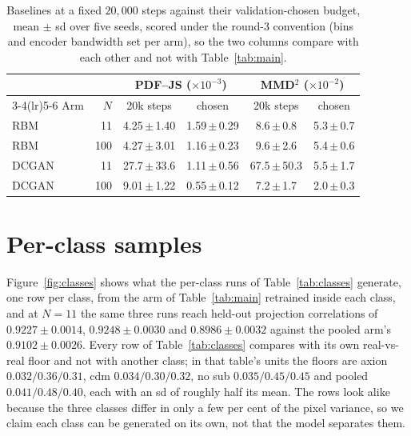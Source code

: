 \documentclass{article}
\begin{document}
\begin{table}[tb]
\centering
\caption{Baselines at a fixed $20{,}000$ steps against their validation-chosen budget, mean $\pm$ sd
over five seeds, scored under the round-3 convention (bins and encoder bandwidth set per arm), so the
two columns compare with each other and not with Table~\ref{tab:main}.}
\label{tab:es}
\scriptsize
\setlength{\tabcolsep}{5pt}
\begin{tabular}{lrcccc}
\toprule
& & \multicolumn{2}{c}{PDF--JS ($\times10^{-3}$)} & \multicolumn{2}{c}{MMD$^2$ ($\times10^{-2}$)} \\
\cmidrule(lr){3-4}\cmidrule(lr){5-6}
Arm & $N$ & 20k steps & chosen & 20k steps & chosen \\
\midrule
RBM   & 11  & 4.25\,$\pm$\,1.40 & 1.59\,$\pm$\,0.29 & 8.6\,$\pm$\,0.8 & 5.3\,$\pm$\,0.7 \\
RBM   & 100 & 4.27\,$\pm$\,3.01 & 1.16\,$\pm$\,0.23 & 9.6\,$\pm$\,2.6 & 5.4\,$\pm$\,0.6 \\
DCGAN & 11  & 27.7\,$\pm$\,33.6 & 1.11\,$\pm$\,0.56 & 67.5\,$\pm$\,50.3 & 5.5\,$\pm$\,1.7 \\
DCGAN & 100 & 9.01\,$\pm$\,1.22 & 0.55\,$\pm$\,0.12 & 7.2\,$\pm$\,1.7 & 2.0\,$\pm$\,0.3 \\
\bottomrule
\end{tabular}
\end{table}

\section{Per-class samples}
\label{app:classes}

Figure~\ref{fig:classes} shows what the per-class runs of Table~\ref{tab:classes} generate, one row
per class, from the arm of Table~\ref{tab:main} retrained inside each class, and at $N{=}11$ the same
three runs reach held-out projection correlations of
$0.9227 \pm 0.0014$, $0.9248 \pm 0.0030$ and $0.8986 \pm 0.0032$ against the pooled arm's
$0.9102 \pm 0.0026$. Every row of Table~\ref{tab:classes} compares with its own real-vs-real floor
and not with another class; in that table's units the floors are axion $0.032/0.36/0.31$, cdm
$0.034/0.30/0.32$, no sub $0.035/0.45/0.45$ and pooled $0.041/0.48/0.40$, each with an sd of roughly
half its mean. The rows look alike because the three classes differ in only a few per cent of the
pixel variance, so we claim each class can be generated on its own, not that the model separates
them.
\end{document}
